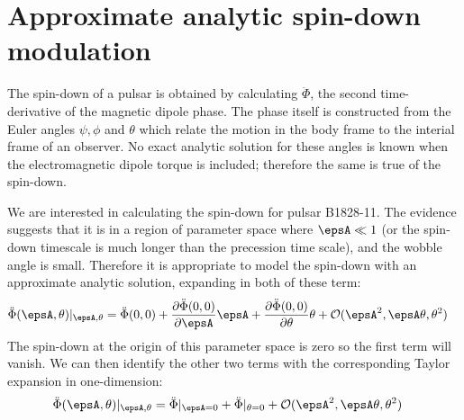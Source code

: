 \documentclass[/home/greg/Thesis/main/main.tex]{subfiles}
\begin{document}
\graphicspath{{/home/greg/Neutron_star_modelling/SpindownRate/PerturbationCalculation/img/}}

\newcommand{\spindown}{\dot{\nu}}
\newcommand{\Aem}{\mathcal{A}_{\mathrm{EM}}}
\newcommand{\Tsd}{\boldsymbol{T}_{\mathrm{s}}}
\newcommand{\wx}{\omega_{\mathrm{x}}}
\newcommand{\wy}{\omega_{\mathrm{y}}}
\newcommand{\wz}{\omega_{\mathrm{z}}}
\newcommand{\Phiddot}{\ddot{\Phi}}
\newcommand{\Phidot}{\dot{\Phi}}

\section{Approximate analytic spin-down modulation}
The spin-down of a pulsar is obtained by calculating $\ddot{\Phi}$,
the second time-derivative of the magnetic dipole phase. The phase itself is
constructed from the Euler angles $\psi, \phi$ and $\theta$ which relate the
motion in the body frame to the interial frame of an observer. No exact analytic
solution for these angles is known when the electromagnetic dipole torque is
included; therefore the same is true of the spin-down.

We are interested in calculating the spin-down for pulsar B1828-11. The 
evidence suggests that it is in a region of parameter space
where $\epsA \ll 1$ (or the spin-down timescale is much longer than the precession
time scale), and the wobble angle is small. Therefore it is appropriate to model
the spin-down with an approximate analytic solution, expanding in both of these term:
\begin{align}
\Phiddot(\epsA, \theta)\vert_{\epsA, \theta}
& = \Phiddot(0, 0) + \frac{\partial \Phiddot(0, 0)}{\partial \epsA}  \epsA
+ \frac{\partial \Phiddot(0, 0) }{\partial \theta} \theta 
+ \mathcal{O}(\epsA^{2}, \epsA \theta, \theta^{2})
\end{align}
The spin-down at the origin of this parameter space is zero so the first term 
will vanish. We can then identify the other two terms with the corresponding
Taylor expansion in one-dimension:
\begin{align}
\Phiddot(\epsA, \theta)\vert_{\epsA, \theta}
& = \ddot{\Phi}|_{\epsA = 0} + \ddot{\Phi}|_{\theta = 0}
+ \mathcal{O}(\epsA^{2}, \epsA \theta, \theta^{2})
\end{align}
\end{document}
